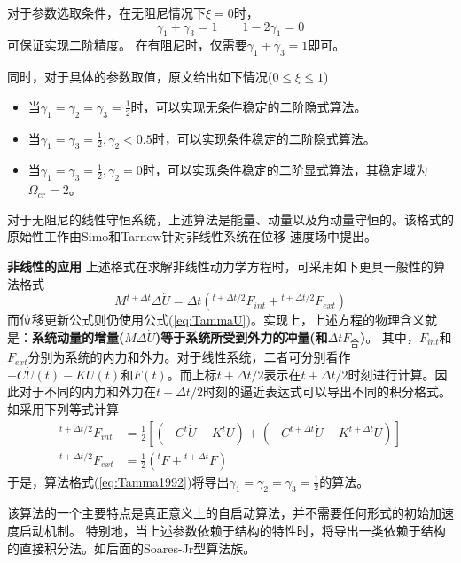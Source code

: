 对于参数选取条件，在无阻尼情况下$\xi=0$时，
\begin{equation}
\gamma_1+\gamma_3=1\qquad 1-2\gamma_1=0
\end{equation}
可保证实现二阶精度。
在有阻尼时，仅需要$\gamma_1+\gamma_3=1$即可。

同时，对于具体的参数取值，原文给出如下情况($0\le\xi\le1$)
\begin{itemize}
\item[\ddag] 当$\gamma_1=\gamma_2=\gamma_3=\frac{1}{2}$时，可以实现无条件稳定的二阶隐式算法\cite{Tamma1990}。
\item[\ddag] 当$\gamma_1=\gamma_3=\frac{1}{2},\gamma_2<0.5$时，可以实现条件稳定的二阶隐式算法。
\item[\ddag] 当$\gamma_1=\gamma_3=\frac{1}{2},\gamma_2=0$时，可以实现条件稳定的二阶显式算法\cite{Tamma1988,Tamma1988c,Tamma1989,Tamma1990a,Tamma1992}，其稳定域为$\Omega_{cr}=2$。
\end{itemize}

对于无阻尼的线性守恒系统，上述算法是能量、动量以及角动量守恒的。该格式的原始性工作由Simo和Tarnow针对非线性系统在位移-速度场中提出\cite{Simo1992b}。

\textbf{非线性的应用} 上述格式在求解非线性动力学方程时，可采用如下更具一般性的算法格式\cite{Tamma1993}
\begin{equation}
M{^{t+\Delta t}\!\Delta \dot{U}}=\Delta t({^{t+\Delta t/2}\!F_{int}}+{^{t+\Delta t/2}\!F_{ext}})\label{eq:Tamma1992}
\end{equation}
而位移更新公式则仍使用公式(\ref{eq:TammaU})。实现上，上述方程的物理含义就是：\textbf{系统动量的增量($M\Delta \dot{U}$)等于系统所受到外力的冲量(和$\Delta tF_{\text{合}}$)}。
其中，$F_{int}$和$F_{ext}$分别为系统的内力和外力。对于线性系统，二者可分别看作$-C\dot{U}(t)-KU(t)$和$F(t)$。而上标$t+\Delta t/2$表示在$t+\Delta t/2$时刻进行计算。因此对于不同的内力和外力在$t+\Delta t/2$时刻的逼近表达式可以导出不同的积分格式。如采用下列等式计算
\begin{align}
{^{t+\Delta t/2}\!F_{int}}&=\frac{1}{2}[(-C{^t\!\dot{U}}-K{^t\!U})+(-C{^{t+\Delta t}\!\dot{U}}-K{^{t+\Delta t}\!U})]\\
{^{t+\Delta t/2}\!F_{ext}}&=\frac{1}{2}({^t\!F}+{^{t+\Delta t}\!F})
\end{align}
于是，算法格式(\ref{eq:Tamma1992})将导出$\gamma_1=\gamma_2=\gamma_3=\frac{1}{2}$的算法\cite{Tamma1990}。

该算法的一个主要特点是真正意义上的自启动算法，并不需要任何形式的初始加速度启动机制。
特别地，当上述参数依赖于结构的特性时，将导出一类依赖于结构的直接积分法。如后面的Soares-Jr型算法族。









